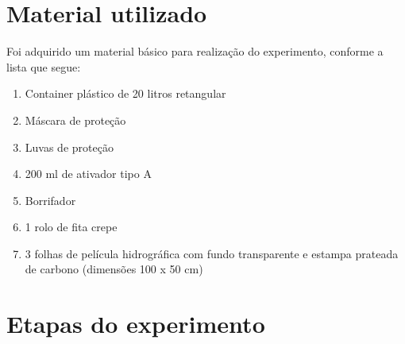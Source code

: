 \appendix


\acresetall 

\section{Material utilizado}
\label{apendice1:material}

Foi adquirido um material básico para realização do experimento, conforme a lista que segue:

\begin{enumerate}[label=\alph*)]
\item Container plástico de 20 litros retangular
\item Máscara de proteção
\item Luvas de proteção
\item 200 ml de ativador tipo A
\item Borrifador
\item 1 rolo de fita crepe
\item 3 folhas de película hidrográfica com fundo transparente e estampa prateada de carbono (dimensões 100 x 50 cm)
\end{enumerate}

\section{Etapas do experimento}
\label{apendice1:etapas}

